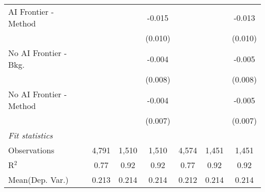\begin{tabular}{lcccccc}
   AI Frontier - Method    &             &               & -0.015        &              &               & -0.013\\   
                           &             &               & (0.010)       &              &               & (0.010)\\   
   No AI Frontier - Bkg.   &             &               & -0.004        &              &               & -0.005\\   
                           &             &               & (0.008)       &              &               & (0.008)\\   
   No AI Frontier - Method &             &               & -0.004        &              &               & -0.005\\   
                           &             &               & (0.007)       &              &               & (0.007)\\   
   \midrule
   \emph{Fit statistics}\\
   Observations            & 4,791       & 1,510         & 1,510         & 4,574        & 1,451         & 1,451\\  
   R$^2$                   & 0.77        & 0.92          & 0.92          & 0.77         & 0.92          & 0.92\\  
Mean(Dep. Var.) & 0.213 & 0.214 & 0.214 & 0.212 & 0.214 & 0.214 \\
   

\end{tabular}
